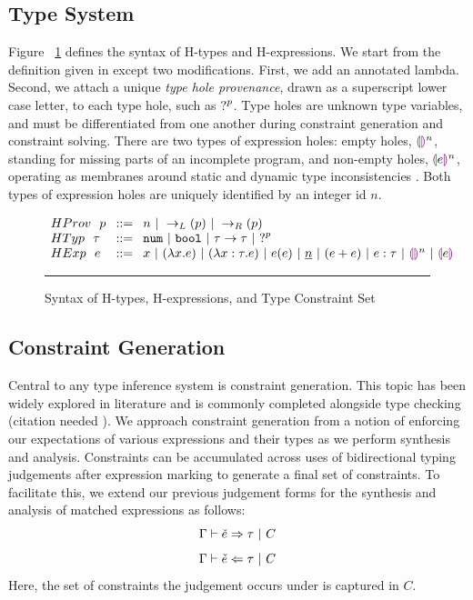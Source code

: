 \subsection{Type System}

\label{sec:typinf}
Figure ~\ref{fig:syntax_fig} defines the syntax of H-types and H-expressions. We start from the definition given in \citet{HazelnutPOPL} except two modifications. First, we add an annotated lambda. Second, we attach a unique \emph{type hole provenance}, drawn as a superscript lower case letter, to each type hole, such as $\mathtt{?}^p$. Type holes are unknown type variables, and must be differentiated from one another during constraint generation and constraint solving. There are two types of expression holes: empty holes, $\textcolor{violet}{\llparenthesis}\textcolor{violet}{\rrparenthesis}^n$, standing for missing parts of an incomplete program, and non-empty holes, $\textcolor{violet}{\llparenthesis} e \textcolor{violet}{\rrparenthesis}^n$, operating as membranes around static and dynamic type inconsistencies \cite{HazelLive}. Both types of expression holes are uniquely identified by an integer id $n$. \par
\begin{figure}[h!]
\vspace{-3px} 
$\arraycolsep=4pt\begin{array}{lll}
HProv~~ p & ::= & 
    n ~\vert~ 
    \rightarrow_{L}(p) ~\vert~ 
    \rightarrow_{R}(p)
    \\
HTyp~~ \tau & ::= &
  \tnum ~\vert~
  \tbool ~\vert~
  \tarr{\tau}{\tau} ~\vert~
  \tehole^p
  \\
HExp~~ e & ::= &
  x ~\vert~
  \lamfunc{x}{e} ~\vert~
  \lamfunc{x:\tau}{e} ~\vert~
  e(e) ~\vert~
  \underlinenum{n} ~\vert~
  (e+e) ~\vert~
  e: \tau ~\vert~
  \ehole^{n}  ~\vert~
  \notehole{e} 
\end{array}$
\hrule
\caption{Syntax of H-types, H-expressions, and Type Constraint Set}
\label{fig:syntax_fig}
\vspace{-5px}
\end{figure}

\subsection{Constraint Generation}
Central to any type inference system is constraint generation. This topic has been widely explored in literature and is commonly completed alongside type checking (citation needed ). We approach constraint generation from a notion of enforcing our expectations of various expressions and their types as we perform synthesis and analysis. Constraints can be accumulated across uses of bidirectional typing judgements after expression marking to generate a final set of constraints. To facilitate this, we extend our previous judgement forms for the synthesis and analysis of matched expressions as follows:
$$\Gamma \vdash \check{e} \Rightarrow \tau ~|~ C$$ 
$$\Gamma \vdash \check{e} \Leftarrow \tau ~|~ C$$
Here, the set of constraints the judgement occurs under is captured in $C$.

